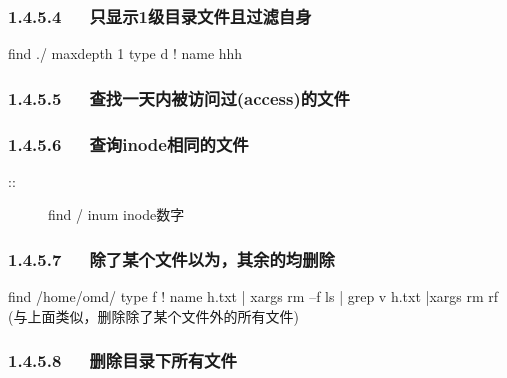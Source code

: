 \documentclass[letterpaper,12pt,english]{sphinxmanual}
\begin{document}
\subsubsection{1.4.5.4   只显示1级目录文件且过滤自身}
\label{\detokenize{001software/001install/linux:id10}}
\begin{sphinxVerbatim}[commandchars=\\\{\}]
find ./ \PYGZhy{}maxdepth 1  \PYGZhy{}type d  ! \PYGZhy{}name \PYGZdq{}hhh\PYGZdq{}
\end{sphinxVerbatim}


\subsubsection{1.4.5.5   查找一天内被访问过(access)的文件}
\label{\detokenize{001software/001install/linux:access}}
\begin{sphinxVerbatim}[commandchars=\\\{\}]
     
\end{sphinxVerbatim}


\subsubsection{1.4.5.6   查询inode相同的文件}
\label{\detokenize{001software/001install/linux:inode}}\begin{description}
\item[{::}] \leavevmode
find / \sphinxhyphen{}inum inode数字

\end{description}


\subsubsection{1.4.5.7   除了某个文件以为，其余的均删除}
\label{\detokenize{001software/001install/linux:id11}}
\begin{sphinxVerbatim}[commandchars=\\\{\}]
find /home/omd/ \PYGZhy{}type f ! \PYGZhy{}name h.txt  | xargs  rm –f
ls | grep \PYGZhy{}v \PYGZdq{}h.txt\PYGZdq{} |xargs rm \PYGZhy{}rf (与上面类似，删除除了某个文件外的所有文件)
\end{sphinxVerbatim}


\subsubsection{1.4.5.8   删除目录下所有文件}
\label{\detokenize{001software/001install/linux:id12}}
\begin{sphinxVerbatim}[commandchars=\\\{\}]
        \PYGZbs{}
       
\end{sphinxVerbatim}
\end{document}
